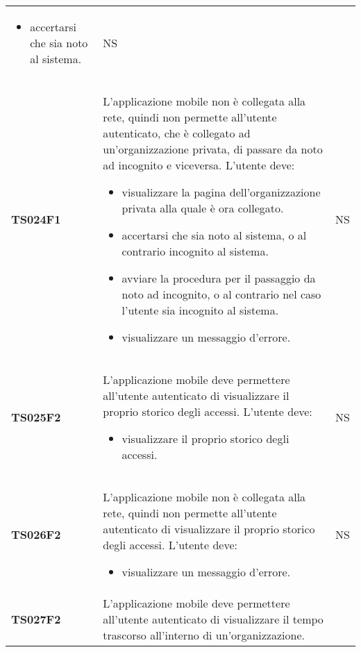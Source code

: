 \documentclass[../piano-di-qualifica.tex]{subfiles}
\begin{document}
\begin{centering}
\begin{longtable}[H]{>{\centering\bfseries}m{3cm} >{}p{10cm} >{\centering\arraybackslash}m{3cm}}
\begin{itemize}
                        \item accertarsi che sia noto al sistema.
                      \end{itemize}
                    & NS \\
        TS024F1     & L'applicazione mobile non è collegata alla rete, quindi non permette all'utente autenticato, che è collegato ad un'organizzazione privata, di passare da noto ad incognito e viceversa. \newline
                      L'utente deve:
                      \begin{itemize}
                        \item visualizzare la pagina dell'organizzazione privata alla quale è ora collegato.
                        \item accertarsi che sia noto al sistema, o al contrario incognito al sistema.
                        \item avviare la procedura per il passaggio da noto ad incognito, o al contrario nel caso l'utente sia incognito al sistema.
                        \item visualizzare un messaggio d'errore.
                      \end{itemize}
                    & NS \\
        TS025F2     & L'applicazione mobile deve permettere all'utente autenticato di visualizzare il proprio storico degli accessi. \newline
                      L'utente deve:
                      \begin{itemize}
                        \item visualizzare il proprio storico degli accessi.
                      \end{itemize}
                    & NS \\
        TS026F2     & L'applicazione mobile non è collegata alla rete, quindi non permette all'utente autenticato di visualizzare il proprio storico degli accessi. \newline
                      L'utente deve:
                      \begin{itemize}
                        \item visualizzare un messaggio d'errore.
                      \end{itemize}
                    & NS \\
        TS027F2     & L'applicazione mobile deve permettere all'utente autenticato di visualizzare il tempo trascorso all'interno di un'organizzazione. \newline

\end{longtable}
\end{centering}
\end{document}
